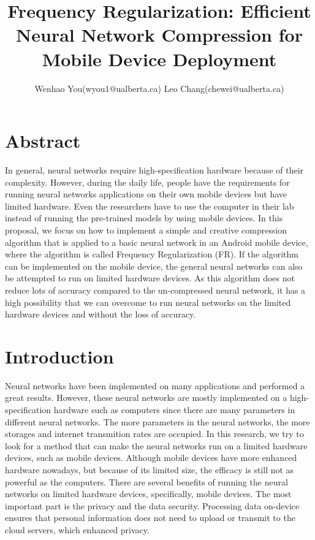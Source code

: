 \documentclass{article}
\title{Frequency Regularization: Efficient Neural Network Compression for Mobile Device Deployment}
\author{Wenhao You(wyou1@ualberta.ca) Leo Chang(chewei@ualberta.ca)}
\date{}
\begin{document}
	\maketitle
	
	\section*{Abstract}

In general, neural networks require high-specification hardware because of their complexity. However, during the daily life, people have the requirements for running neural networks applications on their own mobile devices but have limited hardware. Even the researchers have to use the computer in their lab instead of running the pre-trained models by using mobile devices. In this proposal, we focus on how to implement a simple and creative compression algorithm that is applied to a basic neural network in an Android mobile device, where the algorithm is called Frequency Regularization (FR). If the algorithm can be implemented on the mobile device, the general neural networks can also be attempted to run on limited hardware devices. As this algorithm does not reduce lots of accuracy compared to the un-compressed neural network, it has a high possibility that we can overcome to run neural networks on the limited hardware devices and without the loss of accuracy.



	\section*{Introduction}
	
Neural networks have been implemented on many applications and performed a great results. However, these neural networks are mostly implemented on a high-specification hardware such as computers since there are many parameters in different neural networks. The more parameters in the neural networks, the more storages and internet transmition rates are occupied. In this research, we try to look for a method that can make the neural networks run on a limited hardware devices, such as mobile devices. Although mobile devices have more enhanced hardware nowadays, but because of its limited size, the efficacy is still not as powerful as the computers. There are several benefits of running the neural networks on limited hardware devices, specifically, mobile devices. The most important part is the privacy and the data security. Processing data on-device ensures that personal information does not need to upload or transmit to the cloud servers, which enhanced privacy. 
\end{document}

